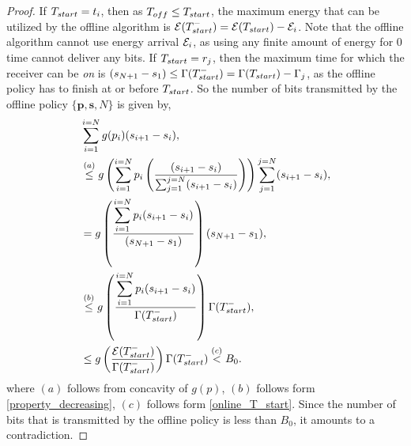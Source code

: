 \begin{proof}
If $T_{\mbox{\scriptsize{start}}}=t_i$, then as $T_{\mbox{\scriptsize{off}}}\le T_{\mbox{\scriptsize{start}}}$, the maximum energy that can be utilized by the offline algorithm is $\ETx(T_{\mbox{\scriptsize{start}}}^-)=\ETx(T_{\mbox{\scriptsize{start}}})-\ETx_i$. Note that the offline algorithm cannot use energy arrival $\mathcal{E}_i$, as using any finite amount of energy for 0 time cannot deliver any bits. If $T_{\mbox{\scriptsize{start}}}=r_j$, then the maximum time for which the receiver can be \textit{on} is $(s_{N+1}-s_1) \le\TRx(T_{\mbox{\scriptsize{start}}}^-)=\TRx(T_{\mbox{\scriptsize{start}}})-\TRx_j$, as the offline policy has to finish at or before $T_{\mbox{\scriptsize{start}}}$. 
So the number of bits transmitted by the offline policy $\{\textbf{p},\textbf{s},N\}$ is given by,
\begin{align}
&\sum_{i=1}^{i=N} g(p_i)(s_{i+1}-s_{i}),
\\
&\stackrel{(a)}{\le} g\left(\sum_{i=1}^{i=N}p_i\left(\frac{(s_{i+1}-s_{i})}{\sum_{j=1}^{j=N}(s_{i+1}-s_{i})}\right)\right) \sum_{j=1}^{j=N} (s_{i+1}-s_{i}),\label{online_eq_3}
\\
&=g\left(\frac{\displaystyle\sum_{i=1}^{i=N}p_i(s_{i+1}-s_{i})}{(s_{N+1}-s_{1})}\right)(s_{N+1}-s_{1}),\label{online_eq_4} 
\\
&\stackrel{(b)}{\le} g\left(\frac{\displaystyle\sum_{i=1}^{i=N}p_i(s_{i+1}-s_{i})}{\TRx(T_{\mbox{\scriptsize{start}}}^-)}\right)\TRx(T_{\mbox{\scriptsize{start}}}^-), \label{online_eq_1}
\\
&\le g\left(\frac{\ETx(T_{\mbox{\scriptsize{start}}}^-)}{\TRx(T_{\mbox{\scriptsize{start}}}^-)}\right)\TRx(T_{\mbox{\scriptsize{start}}}^-)\stackrel{(c)}{<}B_0.\label{online_eq_2}
\end{align}
where $(a)$ follows from concavity of $g(p)$, $(b)$ follows form \eqref{property_decreasing}, $(c)$ follows form \eqref{online_T_start}. Since the number of bits that is transmitted by the offline policy is less than $B_0$, it amounts to a contradiction.
%

\end{proof}
